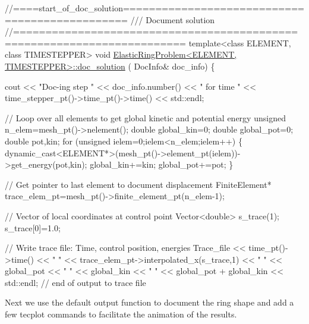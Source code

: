 \begin{DoxyCodeInclude}
\textcolor{comment}{//====start\_of\_doc\_solution===============================================}
\textcolor{comment}{/// Document solution}
\textcolor{comment}{}\textcolor{comment}{//========================================================================}
\textcolor{keyword}{template}<\textcolor{keyword}{class} ELEMENT, \textcolor{keyword}{class} TIMESTEPPER>
\textcolor{keywordtype}{void} \hyperlink{classElasticRingProblem_a9aa904e4cf82d45711f890cd8440ced9}{ElasticRingProblem<ELEMENT, TIMESTEPPER>::doc\_solution}
      (
 DocInfo& doc\_info)
\{ 
 
 cout << \textcolor{stringliteral}{"Doc-ing step "} <<  doc\_info.number()
      << \textcolor{stringliteral}{" for time "} << time\_stepper\_pt()->time\_pt()->time() << std::endl;
 
 
 \textcolor{comment}{// Loop over all elements to get global kinetic and potential energy}
 \textcolor{keywordtype}{unsigned} n\_elem=mesh\_pt()->nelement();
 \textcolor{keywordtype}{double} global\_kin=0;
 \textcolor{keywordtype}{double} global\_pot=0;
 \textcolor{keywordtype}{double} pot,kin;
 \textcolor{keywordflow}{for} (\textcolor{keywordtype}{unsigned} ielem=0;ielem<n\_elem;ielem++)
  \{
   \textcolor{keyword}{dynamic\_cast<}ELEMENT*\textcolor{keyword}{>}(mesh\_pt()->element\_pt(ielem))->get\_energy(pot,kin);
   global\_kin+=kin;
   global\_pot+=pot;
  \}
  

 \textcolor{comment}{// Get pointer to last element to document displacement}
 FiniteElement* trace\_elem\_pt=mesh\_pt()->finite\_element\_pt(n\_elem-1);
 
 \textcolor{comment}{// Vector of local coordinates at control point}
 Vector<double> s\_trace(1);
 s\_trace[0]=1.0;
 
 \textcolor{comment}{// Write trace file: Time, control position, energies}
 Trace\_file << time\_pt()->time()  << \textcolor{stringliteral}{" "} 
            << trace\_elem\_pt->interpolated\_x(s\_trace,1) 
            << \textcolor{stringliteral}{" "} << global\_pot  << \textcolor{stringliteral}{" "} << global\_kin
            << \textcolor{stringliteral}{" "} << global\_pot + global\_kin
            << std::endl; \textcolor{comment}{// end of output to trace file}

\end{DoxyCodeInclude}


Next we use the default output function to document the ring shape and add a few tecplot commands to facilitate the animation of the results.



